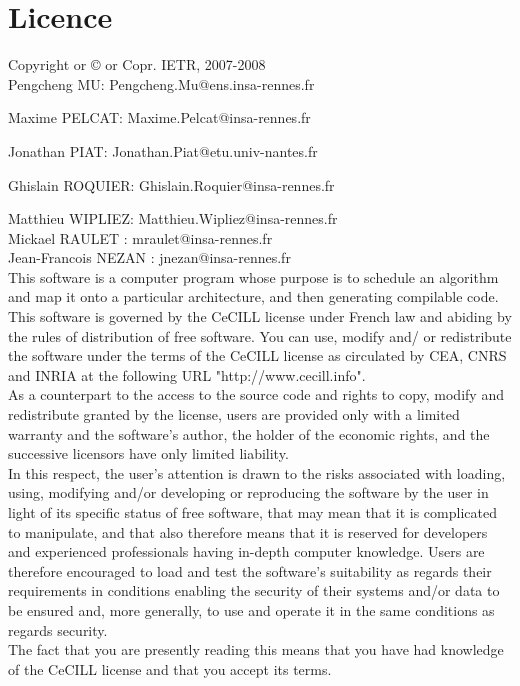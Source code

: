 \chapter{Licence}

Copyright or © or Copr. IETR, 2007-2008 \\

Pengcheng MU: Pengcheng.Mu@ens.insa-rennes.fr

Maxime PELCAT: Maxime.Pelcat@insa-rennes.fr

Jonathan PIAT: Jonathan.Piat@etu.univ-nantes.fr

Ghislain ROQUIER: Ghislain.Roquier@insa-rennes.fr

Matthieu WIPLIEZ: Matthieu.Wipliez@insa-rennes.fr \\

Mickael RAULET : mraulet@insa-rennes.fr \\

Jean-Francois NEZAN : jnezan@insa-rennes.fr \\

This software is a computer program whose purpose is to schedule an algorithm and map it onto a particular architecture, and then generating compilable code. \\

This software is governed by the CeCILL license under French law and
abiding by the rules of distribution of free software.  You can  use, 
modify and/ or redistribute the software under the terms of the CeCILL
license as circulated by CEA, CNRS and INRIA at the following URL
"http://www.cecill.info". \\

As a counterpart to the access to the source code and  rights to copy,
modify and redistribute granted by the license, users are provided only
with a limited warranty  and the software's author,  the holder of the
economic rights,  and the successive licensors  have only  limited
liability. \\

In this respect, the user's attention is drawn to the risks associated
with loading,  using,  modifying and/or developing or reproducing the
software by the user in light of its specific status of free software,
that may mean  that it is complicated to manipulate,  and  that  also
therefore means  that it is reserved for developers  and  experienced
professionals having in-depth computer knowledge. Users are therefore
encouraged to load and test the software's suitability as regards their
requirements in conditions enabling the security of their systems and/or 
data to be ensured and,  more generally, to use and operate it in the 
same conditions as regards security. \\

The fact that you are presently reading this means that you have had
knowledge of the CeCILL license and that you accept its terms.